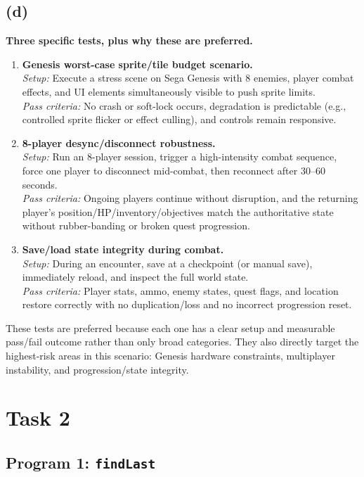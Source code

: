 \subsection{(d)}
\textbf{Three specific tests, plus why these are preferred.}
\begin{enumerate}
    \item \textbf{Genesis worst-case sprite/tile budget scenario.} \\
    \textit{Setup:} Execute a stress scene on Sega Genesis with 8 enemies, player combat effects, and UI elements simultaneously visible to push sprite limits. \\
    \textit{Pass criteria:} No crash or soft-lock occurs, degradation is predictable (e.g., controlled sprite flicker or effect culling), and controls remain responsive.

    \item \textbf{8-player desync/disconnect robustness.} \\
    \textit{Setup:} Run an 8-player session, trigger a high-intensity combat sequence, force one player to disconnect mid-combat, then reconnect after 30--60 seconds. \\
    \textit{Pass criteria:} Ongoing players continue without disruption, and the returning player's position/HP/inventory/objectives match the authoritative state without rubber-banding or broken quest progression.

    \item \textbf{Save/load state integrity during combat.} \\
    \textit{Setup:} During an encounter, save at a checkpoint (or manual save), immediately reload, and inspect the full world state. \\
    \textit{Pass criteria:} Player stats, ammo, enemy states, quest flags, and location restore correctly with no duplication/loss and no incorrect progression reset.
\end{enumerate}

These tests are preferred because each one has a clear setup and measurable pass/fail outcome rather than only broad categories. They also directly target the highest-risk areas in this scenario: Genesis hardware constraints, multiplayer instability, and progression/state integrity.

\section{Task 2}

\subsection{Program 1: \texttt{findLast}}
